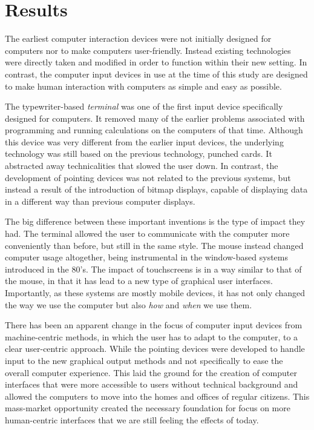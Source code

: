 \section{Results}

The earliest computer interaction devices were not initially designed for computers nor to make computers user-friendly. Instead existing technologies were directly taken and modified in order to function within their new setting. In contrast, the computer input devices in use at the time of this study are designed to make human interaction with computers as simple and easy as possible.

The typewriter-based \emph{terminal} was one of the first input device specifically designed for computers. It removed many of the earlier problems associated with programming and running calculations on the computers of that time. Although this device was very different from the earlier input devices, the underlying technology was still based on the previous technology, punched cards. It abstracted away technicalities that slowed the user down. In contrast, the development of pointing devices was not related to the previous systems, but instead a result of the introduction of bitmap displays, capable of displaying data in a different way than previous computer displays.

The big difference between these important inventions is the type of impact they had. The terminal allowed the user to communicate with the computer more conveniently than before, but still in the same style. The mouse instead changed computer usage altogether, being instrumental in the window-based systems introduced in the 80's. The impact of touchscreens is in a way similar to that of the mouse, in that it has lead to a new type of graphical user interfaces. Importantly, as these systems are mostly mobile devices, it has not only changed the way we use the computer but also \emph{how} and \emph{when} we use them.

There has been an apparent change in the focus of computer input devices from machine-centric methods, in which the user has to adapt to the computer, to a clear user-centric approach. While the pointing devices were developed to handle input to the new graphical output methods and not specifically to ease the overall computer experience. This laid the ground for the creation of computer interfaces that were more accessible to users without technical background and allowed the computers to move into the homes and offices of regular citizens. This mass-market opportunity created the necessary foundation for focus on more human-centric interfaces that we are still feeling the effects of today.

